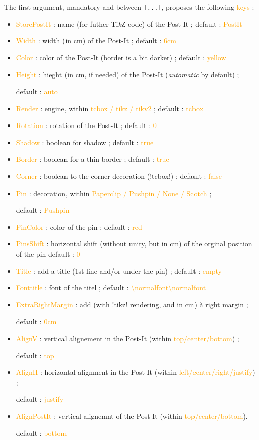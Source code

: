 \documentclass[english,a4paper,11pt]{article}
\providecommand\tikzlogo{Ti\textit{k}Z}
\let\TikZ\tikzlogo
\newcommand\Cle[1]{{\small\sffamily\textlangle \textcolor{orange}{#1}\textrangle}}
\newcommand\cmaj[1]{\tcbox[vignetteMaJ]{#1}\xspace}
\begin{document}
\begin{tipblock}
The first argument, mandatory and between \texttt{[...]}, proposes the following \Cle{keys} :

\begin{itemize}
	\item \cmaj{0.1.3} \Cle{StorePostIt} : name (for futher \TikZ{} code) of the Post-It ; \hfill{}default : \Cle{PostIt}
	\item \Cle{Width} : width (in cm) of the Post-It  ; \hfill{}default : \Cle{6cm}
	\item \Cle{Color} : color of the Post-It (border is a bit darker) ; \hfill{}default : \Cle{yellow}
	\item \Cle{Height} : hieght (in cm, if needed) of the Post-It (\textit{automatic} by default) ;
	
	\hfill{}default : \Cle{auto}
	\item \cmaj{0.1.1} \Cle{Render} : engine, within \Cle{tcbox / tikz / tikv2} ; \hfill{}default : \Cle{tcbox}
	\item \Cle{Rotation} : rotation of the Post-It ; \hfill{}default : \Cle{0}
	\item \Cle{Shadow} : boolean for shadow ; \hfill{}default : \Cle{true}
	\item \Cle{Border} : boolean for a thin border ; \hfill{}default : \Cle{true}
	\item \Cle{Corner} : boolean to the corner decoration (\motcletex!tcbox!) ; \hfill{}default : \Cle{false}
	\item \Cle{Pin} : decoration, within \Cle{Paperclip / Pushpin / None / Scotch} ;
	
	\hfill{}default : \Cle{Pushpin}
	\item \Cle{PinColor} : color of the pin ; \hfill{}default : \Cle{red}
	\item \Cle{PinsShift} : horizontal shift (without unity, but in cm) of the orginal position of the pin \hfill{}default : \Cle{0}
	\item \cmaj{0.1.1} \Cle{Title} : add a title (1st line and/or under the pin) ; \hfill{}default : \Cle{empty}
	\item \cmaj{0.1.1} \Cle{Fonttitle} : font of the titel ; \hfill{}default : \Cle{\textbackslash normalfont\textbackslash normalfont}
	\item \cmaj{0.1.1} \Cle{ExtraRightMargin} : add (with \packagetex!tikz! rendering, and in cm) à right margin ;
	
	\hfill{}default : \Cle{0cm}
	\item \Cle{AlignV} : vertical alignement in the Post-It (within \Cle{top/center/bottom}) ;
	
	\hfill{}default : \Cle{top}
	\item \Cle{AlignH} : horizontal alignment in the Post-It (within \Cle{left/center/right/justify}) ;
	
	\hfill{}default : \Cle{justify}
	\item \Cle{AlignPostIt} : vertical alignemnt of the Post-It (within \Cle{top/center/bottom}).
	
	\hfill{}default : \Cle{bottom}
\end{itemize}
\vspace*{-\baselineskip}\leavevmode
\end{tipblock}
\end{document}
